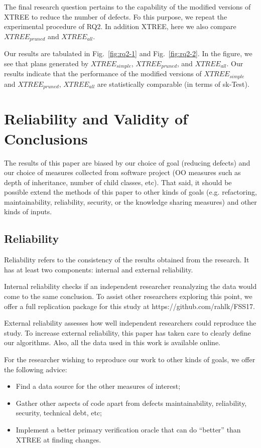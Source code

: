 \documentclass[sigconf, proceedings, 9pt]{acmart}
\newcommand{\fig}[1]{Fig.~\ref{fig:#1}}
\begin{document}
The final research question pertains to the capability of the modified versions 
of XTREE to reduce the number of defects. Fo this purpose, we repeat the 
experimental procedure of RQ2. In addition XTREE, here we also compare 
$XTREE_{pruned}$ and $XTREE_{all}$.



Our results are tabulated in \fig{rq2-1} and \fig{rq2-2}. In the figure, we see 
that plans generated by $XTREE_{simple}$, $XTREE_{pruned}$, and $XTREE_{all}$. 
Our results indicate that the performance of the modified versions of 
$XTREE_{simple}$ and $XTREE_{pruned}$, $XTREE_{all}$ are statistically 
comparable (in terms of sk-Test). 

\section{Reliability and Validity of Conclusions}
\label{sect:valid}


The results of this paper are biased by our choice of goal (reducing defects) 
and our choice of measures collected from software project (OO measures such as 
depth of inheritance, number of child classes, etc). That said, it should be 
possible extend the methods of this paper to other kinds of goals (e.g. 
refactoring, maintainability, reliability, security, or the knowledge sharing 
measures) and other kinds of inputs.

\subsection{Reliability}
Reliability refers to the consistency of the results obtained
from the research. It has at least two components: internal
and external reliability.

Internal reliability checks if an independent researcher
reanalyzing the data would come to the same conclusion.
To assist other researchers exploring this point, we offer a full 
replication package for this study at https://github.com/rahlk/FSS17.

External reliability assesses how well independent researchers
could reproduce the study. To increase external
reliability, this paper has taken care to clearly define our
algorithms. Also, all the data used in this work is available
online.

For the researcher wishing to reproduce our work to other kinds of goals, 
we offer the following advice:

\begin{itemize}
\item Find a data source for the other measures of interest; 
\item Gather other aspects of code apart from defects maintainability, 
reliability, security, technical debt, etc;
\item Implement a better primary verification oracle that can do ``better'' 
than XTREE at finding changes. 
\end{itemize}
\end{document}
